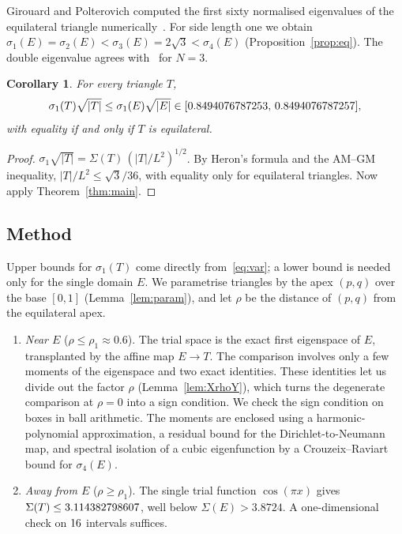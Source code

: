 \documentclass[11pt]{article}
\newtheorem{corollary}[theorem]{Corollary}
\theoremstyle{definition}
\theoremstyle{remark}
\begin{document}
Girouard and Polterovich computed the first sixty normalised eigenvalues of the equilateral triangle
numerically~\cite[Example~3.2.1]{GP}. For side length one we obtain $\sigma_1(E)=\sigma_2(E)<\sigma_3(E)=2\sqrt3<\sigma_4(E)$
(Proposition~\ref{prop:eq}). The double eigenvalue agrees with~\cite[Thm.~1.2]{CGHLY} for $N=3$.

\begin{corollary}\label{cor:area}
For every triangle $T$,
\[\sigma_1(T)\sqrt{|T|}\le\sigma_1(E)\sqrt{|E|}\in[0.8494076787253,\,0.8494076787257],\]
with equality if and only if $T$ is equilateral.
\end{corollary}

\begin{proof}
$\sigma_1\sqrt{|T|}=\Sigma(T)\,(|T|/L^2)^{1/2}$. By Heron's formula and the AM--GM inequality,
$|T|/L^2\le\sqrt3/36$, with equality only for equilateral triangles. Now apply Theorem~\ref{thm:main}.
\end{proof}

\subsection*{Method}
Upper bounds for $\sigma_1(T)$ come directly from~\eqref{eq:var}; a lower bound is needed only for the
single domain $E$. We parametrise triangles by the apex $(p,q)$ over the base $[0,1]$
(Lemma~\ref{lem:param}), and let $\rho$ be the distance of $(p,q)$ from the equilateral apex.
\begin{enumerate}
\item \emph{Near $E$} ($\rho\le\rho_1\approx0.6$). The trial space is the exact first eigenspace of $E$, transplanted by
the affine map $E\to T$. The comparison involves only a few moments of the eigenspace and two exact
identities. These identities let us divide out the factor $\rho$ (Lemma~\ref{lem:XrhoY}), which turns the
degenerate comparison at $\rho=0$ into a sign condition. We check the sign condition on boxes in ball
arithmetic. The moments are enclosed using a harmonic-polynomial approximation, a residual bound for the
Dirichlet-to-Neumann map, and spectral isolation of a cubic eigenfunction by a Crouzeix--Raviart bound for $\sigma_4(E)$.
\item \emph{Away from $E$} ($\rho\ge\rho_1$). The single trial function $\cos(\pi x)$ gives
$\Sigma(T)\le3.114382798607$, well below $\Sigma(E)>3.8724$. A one-dimensional check on $16$ intervals suffices.
\end{enumerate}
\end{document}
